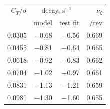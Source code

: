 \begin{tabular}{@{}rrrr@{}}
\toprule
$C_T/\sigma$ & \multicolumn{2}{c}{decay, s$^{-1}$} & $\nu_\zeta$ \\
 & model & test fit & /rev \\
\midrule
0.0305 & $-$0.68 & $-$0.56 & 0.669 \\
0.0455 & $-$0.81 & $-$0.64 & 0.665 \\
0.0618 & $-$0.92 & $-$0.83 & 0.662 \\
0.0704 & $-$1.02 & $-$0.97 & 0.661 \\
0.0831 & $-$1.13 & $-$1.21 & 0.659 \\
0.0981 & $-$1.30 & $-$1.60 & 0.655 \\
\bottomrule
\end{tabular}
